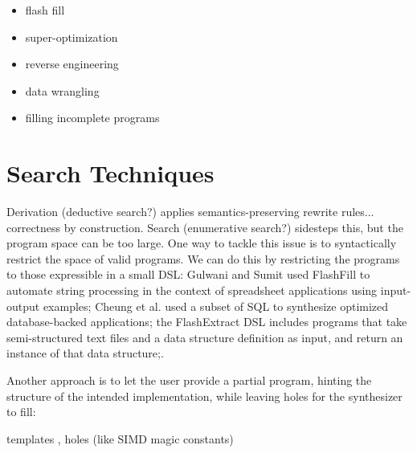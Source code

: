 \begin{itemize}
\item flash fill
\item super-optimization
\item reverse engineering
\item data wrangling
\item filling incomplete programs
\end{itemize}

\section{Search Techniques}
\label{sec:search-techniques}

 Derivation (deductive search?)
applies semantics-preserving rewrite rules... correctness by construction.
Search (enumerative search?) sidesteps this, but the program space can be too
large. One way to tackle this issue is to syntactically restrict the space of
valid programs. We can do this by restricting the programs to those expressible
in a small DSL:  Gulwani and
Sumit \cite{Gulwani:2011} used FlashFill to automate string processing in the
context of spreadsheet applications using input-output examples; Cheung et al.
\cite{Cheung:2013} used a subset of SQL to synthesize optimized database-backed
applications; the FlashExtract DSL \cite{Le:2014} includes programs that take
semi-structured text files and a data structure definition as input, and return
an instance of that data structure;.

Another approach is to let the user provide a partial program, hinting the
structure of the intended implementation, while leaving holes for the
synthesizer to fill:

templates \cite{Srivastava:2012},
holes (like SIMD magic constants) \cite{Solar-Lezama:2008}


